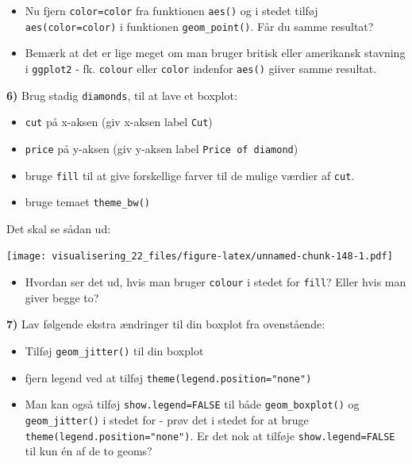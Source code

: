 \documentclass[
]{book}
\providecommand{\tightlist}{%
  \setlength{\itemsep}{0pt}\setlength{\parskip}{0pt}}
\begin{document}
\begin{itemize}
\tightlist
\item
  Nu fjern \texttt{color=color} fra funktionen \texttt{aes()} og i stedet tilføj \texttt{aes(color=color)} i funktionen \texttt{geom\_point()}. Får du samme resultat?
\end{itemize}

\begin{itemize}
\tightlist
\item
  Bemærk at det er lige meget om man bruger britisk eller amerikansk stavning i \texttt{ggplot2} - fk. \texttt{colour} eller \texttt{color} indenfor \texttt{aes()} giiver samme resultat.
\end{itemize}

\textbf{6)} Brug stadig \texttt{diamonds}, til at lave et boxplot:

\begin{itemize}
\tightlist
\item
  \texttt{cut} på x-aksen (giv x-aksen label \texttt{Cut})
\item
  \texttt{price} på y-aksen (giv y-aksen label \texttt{Price\ of\ diamond})
\item
  bruge \texttt{fill} til at give forskellige farver til de mulige værdier af \texttt{cut}.
\item
  bruge temaet \texttt{theme\_bw()}
\end{itemize}

Det skal se sådan ud:

\texttt{[image: visualisering\_22\_files/figure-latex/unnamed-chunk-148-1.pdf]}

\begin{itemize}
\tightlist
\item
  Hvordan ser det ud, hvis man bruger \texttt{colour} i stedet for \texttt{fill}? Eller hvis man giver begge to?
\end{itemize}

\textbf{7)} Lav følgende ekstra ændringer til din boxplot fra ovenstående:

\begin{itemize}
\tightlist
\item
  Tilføj \texttt{geom\_jitter()} til din boxplot
\item
  fjern legend ved at tilføj \texttt{theme(legend.position="none")}
\item
  Man kan også tilføj \texttt{show.legend=FALSE} til både \texttt{geom\_boxplot()} og \texttt{geom\_jitter()} i stedet for - prøv det i stedet for at bruge \texttt{theme(legend.position="none")}. Er det nok at tilføje \texttt{show.legend=FALSE} til kun én af de to geoms?
\end{itemize}
\end{document}
